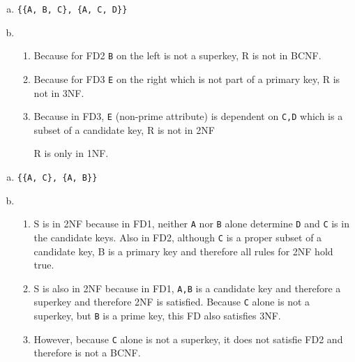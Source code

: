 \documentclass{article}
\begin{document}
\task{}
\begin{enumerate}[a)]
    \item \texttt{\{\{A, B, C\}, \{A, C, D\}\}}
    \item 
    \begin{enumerate}[i]
        \item Because for FD2 \texttt{B} on the left is not a superkey, R is not in BCNF.
        \item Because for FD3 \texttt{E} on the right which is not part of a primary key, R is not in 3NF.
        \item Because in FD3, \texttt{E} (non-prime attribute) is dependent on \texttt{C,D} which is a subset of a candidate key, R is not in 2NF \newline
        
        R is only in 1NF.
    \end{enumerate}
\end{enumerate}

\task{}
\begin{enumerate}[a)]
    \item \texttt{\{\{A, C\}, \{A, B\}\}}
    \item 
    \begin{enumerate}[i]
        \item S is in 2NF because in FD1, neither \texttt{A} nor \texttt{B} alone determine \texttt{D} and \texttt{C} is in the candidate keys. Also in FD2, although \texttt{C} is a proper subset of a candidate key, B is a primary key and therefore all rules for 2NF hold true.
        \item S is also in 2NF because in FD1, \texttt{{A,B}} is a candidate key and therefore a superkey and therefore 2NF is satisfied. Because \texttt{C} alone is not a superkey, but \texttt{B} is a prime key, this FD also satisfies 3NF.
        \item However, because \texttt{C} alone is not a superkey, it does not satisfie FD2 and therefore is not a BCNF.
    \end{enumerate}
\end{enumerate}

\task{}

\task{}
\end{document}
